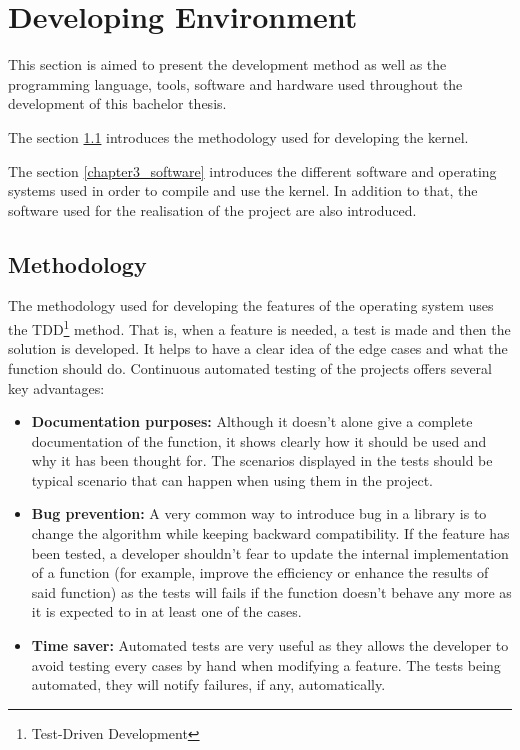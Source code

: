 \chapter{Developing Environment}

This section is aimed to present the development method as well as the programming language, tools, software and hardware used throughout the development of this bachelor thesis.

The section \ref{chapter3_methodology} introduces the methodology used for developing the kernel.

The section \ref{chapter3_software} introduces the different software and operating systems used in order to compile and use the kernel. In addition to that, the software used for the realisation of the project are also introduced. 


\section {Methodology}\label{chapter3_methodology}

The methodology used for developing the features of the operating system uses the TDD\footnote{Test-Driven Development}\cite{tdd} method. That is, when a feature is needed, a test is made and then the solution is developed. It helps to have a clear idea of the edge cases and what the function should do. Continuous automated testing of the projects offers several key advantages:
\begin{itemize}
\item\textbf{Documentation purposes:} Although it doesn't alone give a complete documentation of the function, it shows clearly how it should be used and why it has been thought for. The scenarios displayed in the tests should be typical scenario that can happen when using them in the project.
\item\textbf{Bug prevention:} A very common way to introduce bug in a library is to change the algorithm while keeping backward compatibility. If the feature has been tested, a developer shouldn't fear to update the internal implementation of a function (for example, improve the efficiency or enhance the results of said function) as the tests will fails if the function doesn't behave any more as it is expected to in at least one of the cases.
\item\textbf{Time saver:} Automated tests are very useful as they allows the developer to avoid testing every cases by hand when modifying a feature. The tests being automated, they will notify failures, if any, automatically. 
\end{itemize}

